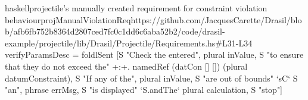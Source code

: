 \begin{codeSnippet}{haskell}{\acs{projectile}'s manually created requirement for constraint violation behaviour}{projManualViolationReq}{https://github.com/JacquesCarette/Drasil/blob/afb6fb752b8364d2807ced7fc0c1dd6c6aba52b2/code/drasil-example/projectile/lib/Drasil/Projectile/Requirements.hs\#L31-L34}
verifyParamsDesc = foldlSent [S "Check the entered", plural inValue,
    S "to ensure that they do not exceed the" +:+. namedRef (datCon [] []) (plural datumConstraint),
    S "If any of the", plural inValue, S "are out of bounds" `sC`
    S "an", phrase errMsg, S "is displayed" `S.andThe` plural calculation, S "stop"]
\end{codeSnippet}
